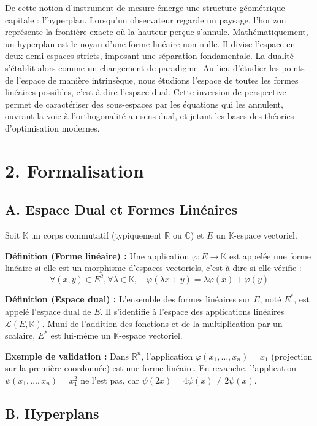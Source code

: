 \documentclass{report}
\begin{document}
De cette notion d'instrument de mesure émerge une structure géométrique capitale : l'hyperplan. Lorsqu'un observateur regarde un paysage, l'horizon représente la frontière exacte où la hauteur perçue s'annule. Mathématiquement, un hyperplan est le noyau d'une forme linéaire non nulle. Il divise l'espace en deux demi-espaces stricts, imposant une séparation fondamentale. La dualité s'établit alors comme un changement de paradigme. Au lieu d'étudier les points de l'espace de manière intrinsèque, nous étudions l'espace de toutes les formes linéaires possibles, c'est-à-dire l'espace dual. Cette inversion de perspective permet de caractériser des sous-espaces par les équations qui les annulent, ouvrant la voie à l'orthogonalité au sens dual, et jetant les bases des théories d'optimisation modernes.

\section*{2. Formalisation}

\subsection*{A. Espace Dual et Formes Linéaires}

Soit $\mathbb{K}$ un corps commutatif (typiquement $\mathbb{R}$ ou $\mathbb{C}$) et $E$ un $\mathbb{K}$-espace vectoriel.

\textbf{Définition (Forme linéaire) :}
Une application $\varphi : E \to \mathbb{K}$ est appelée une forme linéaire si elle est un morphisme d'espaces vectoriels, c'est-à-dire si elle vérifie :
$$ \forall (x, y) \in E^2, \forall \lambda \in \mathbb{K}, \quad \varphi(\lambda x + y) = \lambda \varphi(x) + \varphi(y) $$

\textbf{Définition (Espace dual) :}
L'ensemble des formes linéaires sur $E$, noté $E^*$, est appelé l'espace dual de $E$. Il s'identifie à l'espace des applications linéaires $\mathcal{L}(E, \mathbb{K})$. Muni de l'addition des fonctions et de la multiplication par un scalaire, $E^*$ est lui-même un $\mathbb{K}$-espace vectoriel.

\textbf{Exemple de validation :}
Dans $\mathbb{R}^n$, l'application $\varphi(x_1, \dots, x_n) = x_1$ (projection sur la première coordonnée) est une forme linéaire. En revanche, l'application $\psi(x_1, \dots, x_n) = x_1^2$ ne l'est pas, car $\psi(2x) = 4\psi(x) \neq 2\psi(x)$.

\subsection*{B. Hyperplans}
\end{document}
